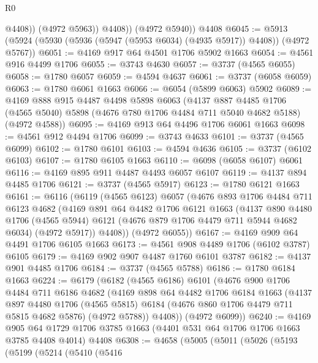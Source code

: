 \begin{lexlean}{R0}
\begin{coremodule}
                @4408))
            (@4972 @5963))
          @4408))
      (@4972 @5940))
    @4408
@6045 := @5913 (@5924 (@5930 (@5936 (@5947 (@5953 @6034) (@4935 @5917)) @4408)) (@4972 @5767))
@6051 := @4169 @917 @64 @4501 @1706 @5902 @1663
@6054 := @4561 @916 @4499 @1706
@6055 := @3743 @4630
@6057 := @3737 (@4565 @6055)
@6058 := @1780 @6057
@6059 := @4594 @4637
@6061 := @3737 (@6058 @6059)
@6063 := @1780 @6061 @1663
@6066 := @6054 (@5899 @6063) @5902
@6089 := @4169
    @888
    @915
    @4487
    @4498
    @5898
    @6063
    (@4137
      @887
      @4485
      @1706
      (@4565 @5040)
      @5898
      (@4676 @780 @1706 @4484 @711 @5040 @4682 @5188)
      (@4972 @4588))
@6095 := @4169 @913 @64 @4496 @1706 @6061 @1663
@6098 := @4561 @912 @4494 @1706
@6099 := @3743 @4633
@6101 := @3737 (@4565 @6099)
@6102 := @1780 @6101
@6103 := @4594 @4636
@6105 := @3737 (@6102 @6103)
@6107 := @1780 @6105 @1663
@6110 := @6098 (@6058 @6107) @6061
@6116 := @4169 @895 @911 @4487 @4493 @6057 @6107
@6119 := @4137 @894 @4485 @1706
@6121 := @3737 (@4565 @5917)
@6123 := @1780 @6121 @1663
@6161 := @6116
    (@6119
      (@4565 @6123)
      @6057
      (@4676
        @893
        @1706
        @4484
        @711
        @6123
        @4682
        (@4169
          @891
          @64
          @4482
          @1706
          @6121
          @1663
          (@4137
            @890
            @4480
            @1706
            (@4565 @5944)
            @6121
            (@4676 @879 @1706 @4479 @711 @5944 @4682 @6034)
            (@4972 @5917))
          @4408))
      (@4972 @6055))
@6167 := @4169 @909 @64 @4491 @1706 @6105 @1663
@6173 := @4561 @908 @4489 @1706 (@6102 @3787) @6105
@6179 := @4169 @902 @907 @4487 @1760 @6101 @3787
@6182 := @4137 @901 @4485 @1706
@6184 := @3737 (@4565 @5788)
@6186 := @1780 @6184 @1663
@6224 := @6179
    (@6182
      (@4565 @6186)
      @6101
      (@4676
        @900
        @1706
        @4484
        @711
        @6186
        @4682
        (@4169
          @898
          @64
          @4482
          @1706
          @6184
          @1663
          (@4137
            @897
            @4480
            @1706
            (@4565 @5815)
            @6184
            (@4676 @860 @1706 @4479 @711 @5815 @4682 @5876)
            (@4972 @5788))
          @4408))
      (@4972 @6099))
@6240 := @4169
    @905
    @64
    @1729
    @1706
    @3785
    @1663
    (@4401 @531 @64 @1706 @1706 @1663 @3785 @4408 @4014)
    @4408
@6308 := @4658
    (@5005
      (@5011
        (@5026
          (@5193
            (@5199
              (@5214
                (@5410
                  (@5416

\end{coremodule}
\end{lexlean}
